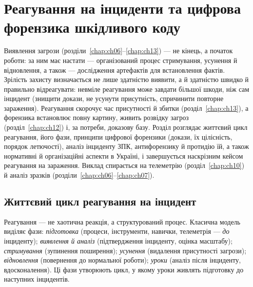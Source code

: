 \chapter{Реагування на інциденти та цифрова форензика шкідливого коду}
\label{chap:ch16}

Виявлення загрози (розділи~\ref{chap:ch06}--\ref{chap:ch13}) --- не кінець, а початок роботи: за ним має настати  --- організований процес стримування, усунення й відновлення, а також  --- дослідження артефактів для встановлення фактів. Зрілість захисту визначається не лише здатністю виявити, а й здатністю швидко й правильно відреагувати: невміле реагування може завдати більшої шкоди, ніж сам інцидент (знищити докази, не усунути присутність, спричинити повторне зараження). Реагування скорочує час присутності й збитки (розділ~\ref{chap:ch13}), а форензика встановлює повну картину, живить розвідку загроз (розділ~\ref{chap:ch12}) і, за потреби, доказову базу. Розділ розглядає життєвий цикл реагування, його фази, принципи цифрової форензики (докази, їх цілісність, порядок летючості), аналіз інциденту ЗПК, антифорензику й протидію їй, а також нормативні й організаційні аспекти в Україні, і завершується наскрізним кейсом реагування на зараження. Виклад спирається на телеметрію (розділ~\ref{chap:ch10}) й аналіз зразків (розділи~\ref{chap:ch06}--\ref{chap:ch07}).

\section{Життєвий цикл реагування на інцидент}\label{sec:ch16-lifecycle}

Реагування --- не хаотична реакція, а структурований процес. Класична модель~\cite{nist-61,ch16:sans-ir} виділяє фази: \emph{підготовка} (процеси, інструменти, навички, телеметрія --- \emph{до} інциденту); \emph{виявлення й аналіз} (підтвердження інциденту, оцінка масштабу); \emph{стримування} (зупинення поширення); \emph{усунення} (видалення присутності загрози); \emph{відновлення} (повернення до нормальної роботи); \emph{уроки} (аналіз після інциденту, вдосконалення). Ці фази утворюють цикл, у якому уроки живлять підготовку до наступних інцидентів.

\begin{tikzfig}
\end{tikzfig}

